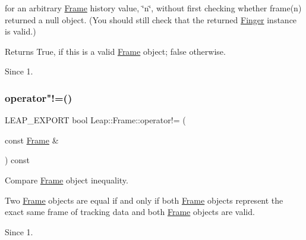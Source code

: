 \begin{DoxyCodeInclude}
\end{DoxyCodeInclude}


for an arbitrary \hyperlink{class_leap_1_1_frame}{Frame} history value, \char`\"{}n\char`\"{}, without first checking whether frame(n) returned a null object. (You should still check that the returned \hyperlink{class_leap_1_1_finger}{Finger} instance is valid.)

\begin{DoxyReturn}{Returns}
True, if this is a valid \hyperlink{class_leap_1_1_frame}{Frame} object; false otherwise. 
\end{DoxyReturn}
\begin{DoxySince}{Since}
1. 
\end{DoxySince}
\mbox{\label{class_leap_1_1_frame_a437502d00cc85def291fbe48222a9644}} 
\subsubsection{\texorpdfstring{operator"!=()}{operator!=()}}
{\footnotesize\ttfamily L\+E\+A\+P\+\_\+\+E\+X\+P\+O\+RT bool Leap\+::\+Frame\+::operator!= (\begin{DoxyParamCaption}\item[{const \hyperlink{class_leap_1_1_frame}{Frame} \&}]{ }\end{DoxyParamCaption}) const}

Compare \hyperlink{class_leap_1_1_frame}{Frame} object inequality.


\begin{DoxyCodeInclude}
\end{DoxyCodeInclude}


Two \hyperlink{class_leap_1_1_frame}{Frame} objects are equal if and only if both \hyperlink{class_leap_1_1_frame}{Frame} objects represent the exact same frame of tracking data and both \hyperlink{class_leap_1_1_frame}{Frame} objects are valid. \begin{DoxySince}{Since}
1. 
\end{DoxySince}
\mbox{\label{class_leap_1_1_frame_a9ce903f44d733d0d27d7dc599c7ca30c}} 
